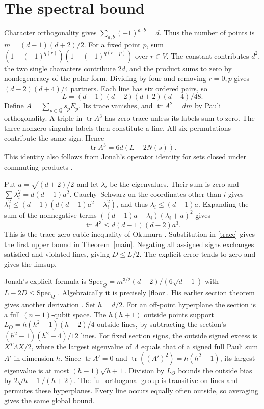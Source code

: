 \documentclass[11pt]{article}
\newcommand{\tr}{\operatorname{tr}}
\begin{document}
\section{The spectral bound}
Character orthogonality gives $\sum_{a,b}(-1)^{a\cdot b}=d$. Thus the number of points is $m=(d-1)(d+2)/2$. For a fixed point $p$, sum
$(1+(-1)^{q(r)})(1+(-1)^{q(r+p)})$ over $r\in V$. The constant contributes $d^2$, the two single characters contribute $2d$, and the product sums to zero by nondegeneracy of the polar form. Dividing by four and removing $r=0,p$ gives $(d-2)(d+4)/4$ partners. Each line has six ordered pairs, so
\[
 L=(d-1)(d-2)(d+2)(d+4)/48.
\]
Define $A=\sum_{p\in Q}s_pE_p$. Its trace vanishes, and $\tr A^2=dm$ by Pauli orthogonality. A triple in $\tr A^3$ has zero trace unless its labels sum to zero. The three nonzero singular labels then constitute a line. All six permutations contribute the same sign. Hence
\begin{equation}\label{trace}
 \tr A^3=6d(L-2N(s)).
\end{equation}
This identity also follows from Jonah's operator identity for sets closed under commuting products \cite[Thm.~1]{structure}.

Put $a=\sqrt{(d+2)/2}$ and let $\lambda_i$ be the eigenvalues. Their sum is zero and $\sum\lambda_i^2=d(d-1)a^2$. Cauchy--Schwarz on the coordinates other than $i$ gives $\lambda_i^2\le(d-1)(d(d-1)a^2-\lambda_i^2)$, and thus $\lambda_i\le(d-1)a$. Expanding the sum of the nonnegative terms $((d-1)a-\lambda_i)(\lambda_i+a)^2$ gives
\begin{equation}\label{floor}
 \tr A^3\le d(d-1)(d-2)a^3 .
\end{equation}
This is the trace-zero cubic inequality of Okumura \cite{okumura}. Substitution in \eqref{trace} gives the first upper bound in Theorem~\ref{main}. Negating all assigned signs exchanges satisfied and violated lines, giving $D\le L/2$. The explicit error tends to zero and gives the limsup.

Jonah's explicit formula is $\mathrm{Spec}_Q=m^{3/2}(d-2)/(6\sqrt{d-1})$ with $L-2D\le\mathrm{Spec}_Q$ \cite[Thm.~6]{structure}. Algebraically it is precisely \eqref{floor}. His earlier section theorem gives another derivation \cite[Thm.~2]{section}. Set $h=d/2$. For an off-point hyperplane the section is a full $(n-1)$-qubit space. The $h(h+1)$ outside points support $L_O=h(h^2-1)(h+2)/4$ outside lines, by subtracting the section's $(h^2-1)(h^2-4)/12$ lines. For fixed section signs, the outside signed excess is $X^T\Lambda X/2$, where the largest eigenvalue of $\Lambda$ equals that of a signed full Pauli sum $A'$ in dimension $h$. Since $\tr A'=0$ and $\tr((A')^2)=h(h^2-1)$, its largest eigenvalue is at most $(h-1)\sqrt{h+1}$. Division by $L_O$ bounds the outside bias by $2\sqrt{h+1}/(h+2)$. The full orthogonal group is transitive on lines and permutes these hyperplanes. Every line occurs equally often outside, so averaging gives the same global bound.
\end{document}

